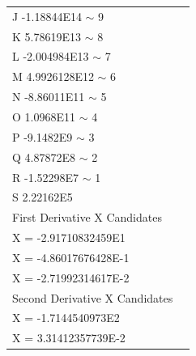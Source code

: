 \documentclass{article}
\begin{document}
\begin{table}
\begin{tabular}{@{}ll@{}}
J -1.18844E14 $\sim$ 9         &  \\
K 5.78619E13 $\sim$ 8          &  \\
L -2.004984E13 $\sim$ 7        &  \\
M 4.9926128E12 $\sim$ 6        &  \\
N -8.86011E11 $\sim$ 5         &  \\
O 1.0968E11 $\sim$ 4           &  \\
P -9.1482E9 $\sim$ 3           &  \\
Q 4.87872E8 $\sim$ 2           &  \\
R -1.52298E7 $\sim$ 1          &  \\
S 2.22162E5                    &  \\
First Derivative X Candidates  &  \\
X = -2.91710832459E1           &  \\
X = -4.86017676428E-1          &  \\
X = -2.71992314617E-2          &  \\
Second Derivative X Candidates &  \\
X = -1.7144540973E2            &  \\
X = 3.31412357739E-2           &  \\ \bottomrule
\end{tabular}
\end{table}
\end{document}
